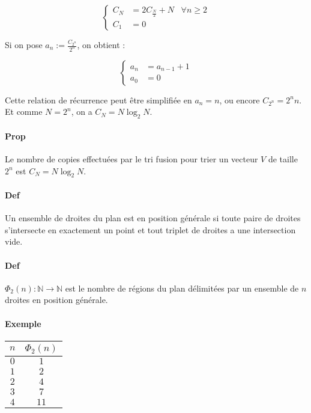 \documentclass{article}
\begin{document}
			\[
			  \left\{
				\begin{aligned}
				  C_N &= 2C_{\frac N2} + N \;\;\; \forall n \geq 2 \\
				  C_1 &= 0
				\end{aligned}
			  \right.
			\]

			Si on pose $a_n := \frac {C_{2^n}}{2^n}$, on obtient :

			\[
			  \left\{
				\begin{aligned}
				  a_n &= a_{n-1} + 1 \\
				  a_0 &= 0
				\end{aligned}
			  \right.
			\]

			Cette relation de récurrence peut être simplifiée en $a_n = n$, ou encore $C_{2^n} = 2^nn$. Et comme $N = 2^n$, on a $C_N = N\log_2N$.

			\paragraph{Prop} Le nombre de copies effectuées par le tri fusion pour trier un vecteur $V$ de taille $2^n$ est $C_N = N\log_2N$.

			\paragraph{Def} Un ensemble de droites du plan est en position générale si toute paire de droites s'intersecte en exactement un point et tout triplet de droites
			a une intersection vide.

			\paragraph{Def} $\Phi_2(n) : \mathbb N \to \mathbb N$ est le nombre de régions du plan délimitées par un ensemble de $n$ droites en position générale.

			\paragraph{Exemple}


				\begin{center}
					\begin{tabular}{c | c}
						$n$ & $\Phi_2(n)$ \\ \hline
						$0$ & $1$ \\
						$1$ & $2$ \\
						$2$ & $4$ \\
						$3$ & $7$ \\
						$4$ & $11$
					\end{tabular}
				\end{center}
\end{document}

